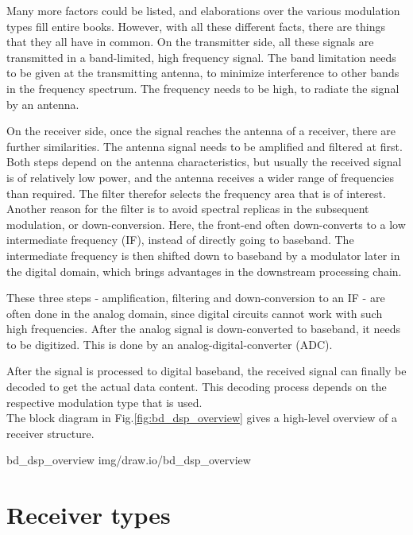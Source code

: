 Many more factors could be listed, and elaborations over the various modulation types fill entire books.
However, with all these different facts, there are things that they all have in common.
On the transmitter side, all these signals are transmitted in a band-limited, high frequency signal.
The band limitation needs to be given at the transmitting antenna, to minimize interference to other bands in the frequency spectrum.
The frequency needs to be high, to radiate the signal by an antenna.

On the receiver side, once the signal reaches the antenna of a receiver, there are further similarities.
The antenna signal needs to be amplified and filtered at first.
Both steps depend on the antenna characteristics, but usually the received signal is of relatively low power, and the antenna receives a wider range of frequencies than required.
The filter therefor selects the frequency area that is of interest.
Another reason for the filter is to avoid spectral replicas in the subsequent modulation, or down-conversion.
Here, the front-end often down-converts to a low intermediate frequency (IF), instead of directly going to baseband.
The intermediate frequency is then shifted down to baseband by a modulator later in the digital domain, which brings advantages in the downstream processing chain. %

These three steps - amplification, filtering and down-conversion to an IF - are often done in the analog domain, since digital circuits cannot work with such high frequencies.
After the analog signal is down-converted to baseband, it needs to be digitized.
This is done by an analog-digital-converter (ADC).

After the signal is processed to digital baseband, the received signal can finally be decoded to get the actual data content.
This decoding process depends on the respective modulation type that is used.\\

\noindent
The block diagram in Fig.\ref{fig:bd_dsp_overview} gives a high-level overview of a receiver structure.

 {bd_dsp_overview} {img/draw.io/bd_dsp_overview}

\section{Receiver types}

